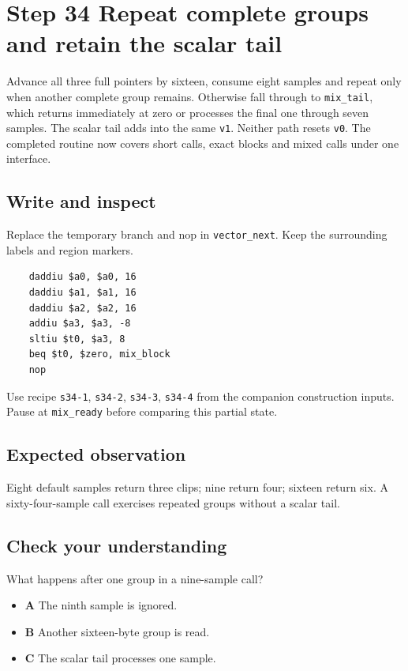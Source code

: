 \section{Step 34 Repeat complete groups and retain the scalar tail}\label{pcm-s34}

Advance all three full pointers by sixteen, consume eight samples and repeat only when another complete group remains. Otherwise fall through to \texttt{mix\_tail}, which returns immediately at zero or processes the final one through seven samples. The scalar tail adds into the same \texttt{v1}. Neither path resets \texttt{v0}. The completed routine now covers short calls, exact blocks and mixed calls under one interface.

\subsection{Write and inspect}
Replace the temporary branch and nop in \texttt{vector\_next}. Keep the surrounding labels and region markers.

\begin{verbatim}
    daddiu $a0, $a0, 16
    daddiu $a1, $a1, 16
    daddiu $a2, $a2, 16
    addiu $a3, $a3, -8
    sltiu $t0, $a3, 8
    beq $t0, $zero, mix_block
    nop
\end{verbatim}
Use recipe \texttt{s34-1}, \texttt{s34-2}, \texttt{s34-3}, \texttt{s34-4} from the companion construction inputs. Pause at \texttt{mix\_ready} before comparing this partial state.

\subsection{Expected observation}
Eight default samples return three clips; nine return four; sixteen return six. A sixty-four-sample call exercises repeated groups without a scalar tail.

\subsection{Check your understanding}
What happens after one group in a nine-sample call?

\begin{itemize}
  \item \textbf{A} The ninth sample is ignored.
  \item \textbf{B} Another sixteen-byte group is read.
  \item \textbf{C} The scalar tail processes one sample.
\end{itemize}
